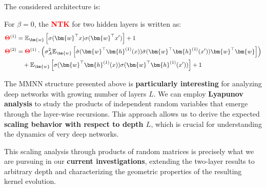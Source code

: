 \documentclass[a4paper]{article}
\theoremstyle{plain}
\theoremstyle{definition}
\theoremstyle{remark}
\begin{document}
The considered architecture is:
\begin{center}
\end{center}
\begin{tcolorbox}[colback=personalcontribcolor!10,colframe=personalcontribcolor,title={\textbf{Main Formula: Two Layer MMNN NTK}},enhanced,drop shadow]
For $\beta = 0$, the \textcolor{red}{\textbf{NTK}} for two hidden layers is written as:
\begin{align}
\textcolor{red}{\boldsymbol{\Theta}}^{(1)} &= \mathbb{E}_{\bm{w}} \left[ \sigma(\bm{w}^\top x) \sigma(\bm{w}^\top x') \right] + 1 \\
\textcolor{red}{\boldsymbol{\Theta}}^{(2)} &= \textcolor{red}{\boldsymbol{\Theta}}^{(1)} \cdot \left(\sigma_A^2 \mathbb{E}_{\bm{w}} \left[ \dot{\sigma}(\bm{w}^\top \bm{h}^{(1)}(x)) \dot{\sigma}(\bm{w}^\top \bm{h}^{(1)}(x')) \bm{w}^\top\bm{w} \right]\right) \nonumber\\
&\quad + \mathbb{E}_{\bm{w}} \left[ \sigma(\bm{w}^\top \bm{h}^{(1)}(x)) \sigma(\bm{w}^\top \bm{h}^{(1)}(x')) \right] + 1
\end{align}
\end{tcolorbox}





\begin{tcolorbox}[colback=green!15,colframe=green!80!black,title={\textbf{Ongoing Research: Deep Network Scaling via Lyapunov Analysis}},enhanced,drop shadow,boxrule=2pt]
The MMNN structure presented above is \textbf{particularly interesting} for analyzing deep networks with growing number of layers $L$. We can employ \textbf{Lyapunov analysis} to study the products of independent random variables that emerge through the layer-wise recursions. This approach allows us to derive the expected \textbf{scaling behavior with respect to depth $L$}, which is crucial for understanding the dynamics of very deep networks.

This scaling analysis through products of random matrices is precisely what we are pursuing in our \textbf{current investigations}, extending the two-layer results to arbitrary depth and characterizing the geometric properties of the resulting kernel evolution.
\end{tcolorbox}
\end{document}
